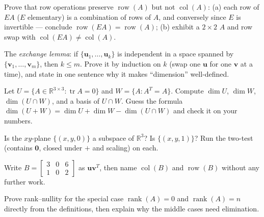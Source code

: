 \begin{exercise}[hard]
Prove that row operations preserve $\operatorname{row}(A)$ but not $\operatorname{col}(A)$: (a) each row of $EA$ ($E$ elementary) is a combination of rows of $A$, and conversely since $E$ is invertible — conclude $\operatorname{row}(EA)=\operatorname{row}(A)$; (b) exhibit a $2\times2$ $A$ and row swap with $\operatorname{col}(EA)\neq\operatorname{col}(A)$.
\end{exercise}
\begin{exercise}[hard]
The \emph{exchange lemma}: if $\{\mathbf{u}_1,\dots,\mathbf{u}_k\}$ is independent in a space spanned by $\{\mathbf{v}_1,\dots,\mathbf{v}_m\}$, then $k\le m$. Prove it by induction on $k$ (swap one $\mathbf{u}$ for one $\mathbf{v}$ at a time), and state in one sentence why it makes ``dimension'' well-defined.
\end{exercise}
\begin{exercise}[hard]
Let $U=\{A\in\mathbb{R}^{3\times3}:\operatorname{tr}A=0\}$ and $W=\{A:A^{T}=A\}$. Compute $\dim U$, $\dim W$, $\dim(U\cap W)$, and a basis of $U\cap W$. Guess the formula $\dim(U+W)=\dim U+\dim W-\dim(U\cap W)$ and check it on your numbers.
\end{exercise}
\begin{exercise}[easy]
Is the $xy$-plane $\{(x,y,0)\}$ a subspace of $\mathbb{R}^3$? Is
$\{(x,y,1)\}$? Run the two-test (contains $\mathbf 0$, closed under $+$
and scaling) on each.
\end{exercise}
\begin{exercise}[medium]
Write $B=\begin{bmatrix}3&0&6\\1&0&2\end{bmatrix}$ as
$\mathbf{u}\mathbf{v}^{T}$, then name $\operatorname{col}(B)$ and
$\operatorname{row}(B)$ without any further work.
\end{exercise}
\begin{exercise}[hard]
Prove rank--nullity for the special case $\operatorname{rank}(A)=0$ and
$\operatorname{rank}(A)=n$ directly from the definitions, then explain
why the middle cases need elimination.
\end{exercise}

